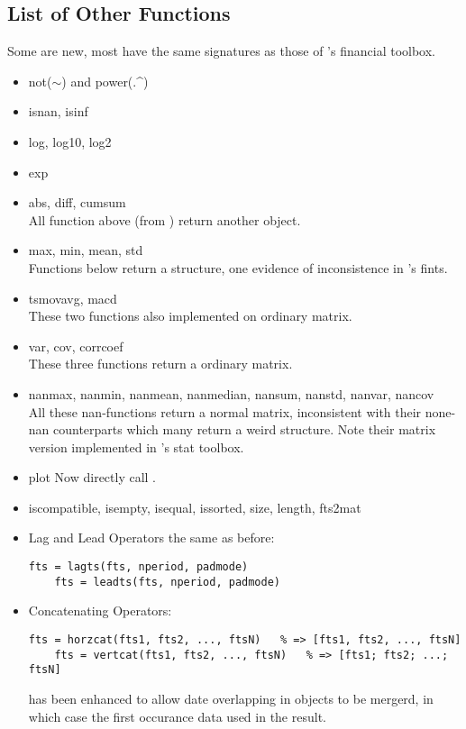 \subsection{List of Other Functions}
Some are new, most have the same signatures as those of \matlab's financial toolbox.
{\ttfamily
    \begin{itemize}
	\item not($\sim$) \textnormal{and} power($.$\^{})
	\item isnan, isinf
	\item log, log10, log2
	\item exp
	\item abs, diff, cumsum\\
	      \textnormal{All function above (from ) return another \myfints{} object.}
	\item max, min, mean, std \\
	      \textnormal{Functions below return a structure, one evidence of inconsistence in \matlab's fints.}
	\item tsmovavg, macd \\
	      \textnormal{These two functions also implemented on ordinary matrix.}
	\item var, cov, corrcoef \\
	      \textnormal{These three functions return a ordinary matrix.}
   \item nanmax, nanmin, nanmean, nanmedian, nansum, nanstd, nanvar, nancov \\
	      \textnormal{All these nan-functions return a normal matrix, 
		  inconsistent with their none-nan counterparts which many return a weird structure.
		  Note their matrix version implemented in \matlab's stat toolbox.}
   \item plot 
	      \textnormal{Now directly call .}
	\item iscompatible, isempty, isequal, issorted, size, length, fts2mat
   \item \textnormal{Lag and Lead Operators the same as before:}
   \begin{lstlisting}[numbers=none]
    fts = lagts(fts, nperiod, padmode)
    fts = leadts(fts, nperiod, padmode)
   \end{lstlisting}
   \item \textnormal{Concatenating Operators:}
   \begin{lstlisting}[numbers=none]
    fts = horzcat(fts1, fts2, ..., ftsN)   % => [fts1, fts2, ..., ftsN]
    fts = vertcat(fts1, fts2, ..., ftsN)   % => [fts1; fts2; ...; ftsN]
	\end{lstlisting}
		\textnormal{ has been enhanced to allow date overlapping in \myfints{} objects to be mergerd,
		in which case the first occurance data used in the result.}
	\end{itemize}
}
